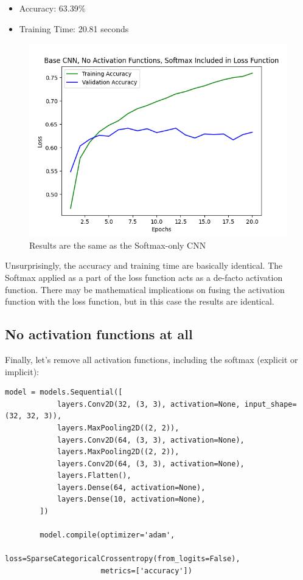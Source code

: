 \documentclass{article}
\begin{document}
    \begin{itemize}
        \item Accuracy: 63.39\%
        \item Training Time: 20.81 seconds
    \end{itemize}

    \begin{figure}[!htbp]
        \centerline{\includegraphics[width=0.55\columnwidth]{Base CNN, No Activation Functions, Softmax Included in Loss Function}}
        \caption{Results are the same as the Softmax-only CNN}
        \label{fig:sneaky-softmax}
    \end{figure}

    Unsurprisingly, the accuracy and training time are basically identical.
    The Softmax applied as a part of the loss function acts as a de-facto activation function.
    There may be mathematical implications on fusing the activation function with the loss function, but in this case the results are identical.

    \subsection{No activation functions at all}\label{subsec:no-activation-functions-at-all}

    Finally, let's remove all activation functions, including the softmax (explicit or implicit):

    \begin{lstlisting}[label={lst:no_activations}]
        model = models.Sequential([
            layers.Conv2D(32, (3, 3), activation=None, input_shape=(32, 32, 3)),
            layers.MaxPooling2D((2, 2)),
            layers.Conv2D(64, (3, 3), activation=None),
            layers.MaxPooling2D((2, 2)),
            layers.Conv2D(64, (3, 3), activation=None),
            layers.Flatten(),
            layers.Dense(64, activation=None),
            layers.Dense(10, activation=None),
        ])

        model.compile(optimizer='adam',
                      loss=SparseCategoricalCrossentropy(from_logits=False),
                      metrics=['accuracy'])
    \end{lstlisting}
\end{document}

